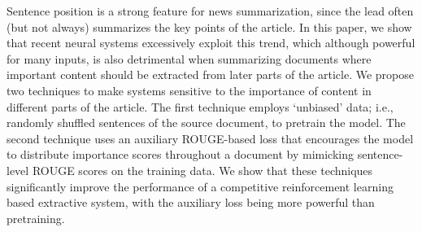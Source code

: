 Sentence position is a strong feature for news summarization, since the lead often (but not always) summarizes the key points of the article. In this paper, we show that recent neural systems excessively exploit this trend, which although powerful for many inputs, is also detrimental when summarizing documents where important content should be extracted from later parts of the article. We propose two techniques to make systems sensitive to the importance of content in different parts of the article. The first technique employs `unbiased' data; i.e., randomly shuffled sentences of the source document, to pretrain the model. The second technique uses an auxiliary ROUGE-based loss that encourages the model to distribute importance scores throughout a document by mimicking sentence-level ROUGE scores on the training data. We show that these techniques significantly improve the performance of a competitive reinforcement learning based extractive system, 
with the auxiliary loss being more powerful than pretraining.